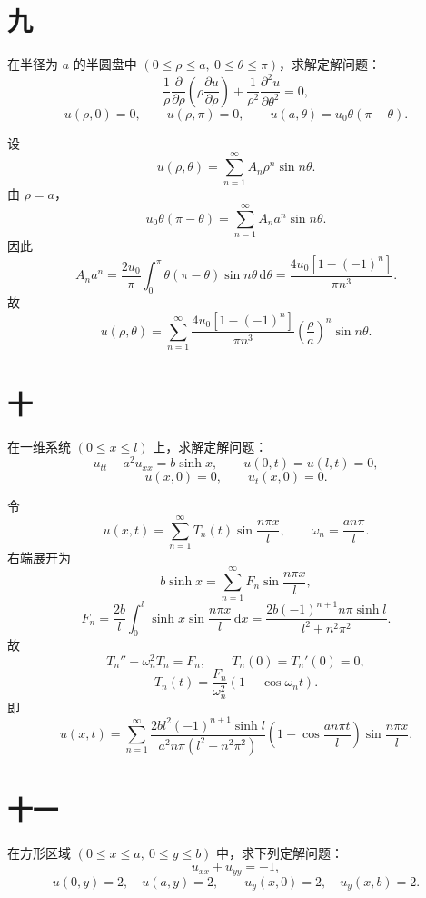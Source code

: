\documentclass[UTF8,zihao=-4]{ctexart}
\begin{document}
\section*{九}

在半径为 $a$ 的半圆盘中 $(0\le\rho\le a,\ 0\le\theta\le\pi)$，求解定解问题：
\[
\dfrac1\rho\dfrac{\partial}{\partial\rho}\left(\rho\dfrac{\partial u}{\partial\rho}\right)
+\dfrac1{\rho^2}\dfrac{\partial^2u}{\partial\theta^2}=0,
\]
\[
u(\rho,0)=0,\qquad u(\rho,\pi)=0,\qquad
u(a,\theta)=u_0\theta(\pi-\theta).
\]

设
\[
u(\rho,\theta)=\sum_{n=1}^{\infty}A_n\rho^n\sin n\theta.
\]
由 $\rho=a$，
\[
u_0\theta(\pi-\theta)=\sum_{n=1}^{\infty}A_na^n\sin n\theta.
\]
因此
\[
A_na^n=\dfrac{2u_0}{\pi}\int_0^\pi \theta(\pi-\theta)\sin n\theta\,\mathrm{d}\theta
=\dfrac{4u_0\left[1-(-1)^n\right]}{\pi n^3}.
\]
故
\[
u(\rho,\theta)=
\sum_{n=1}^{\infty}
\dfrac{4u_0\left[1-(-1)^n\right]}{\pi n^3}
\left(\dfrac{\rho}{a}\right)^n\sin n\theta.
\]

\section*{十}

在一维系统 $(0\le x\le l)$ 上，求解定解问题：
\[
u_{tt}-a^2u_{xx}=b\sinh x,\qquad
u(0,t)=u(l,t)=0,
\]
\[
u(x,0)=0,\qquad u_t(x,0)=0.
\]

令
\[
u(x,t)=\sum_{n=1}^{\infty}T_n(t)\sin\dfrac{n\pi x}{l},\qquad
\omega_n=\dfrac{an\pi}{l}.
\]
右端展开为
\[
b\sinh x=\sum_{n=1}^{\infty}F_n\sin\dfrac{n\pi x}{l},
\]
\[
F_n=\dfrac{2b}{l}\int_0^l\sinh x\sin\dfrac{n\pi x}{l}\,\mathrm{d}x
=\dfrac{2b(-1)^{n+1}n\pi\sinh l}{l^2+n^2\pi^2}.
\]
故
\[
T_n''+\omega_n^2T_n=F_n,\qquad T_n(0)=T_n'(0)=0,
\]
\[
T_n(t)=\dfrac{F_n}{\omega_n^2}(1-\cos\omega_nt).
\]
即
\[
u(x,t)=\sum_{n=1}^{\infty}
\dfrac{2bl^2(-1)^{n+1}\sinh l}{a^2n\pi(l^2+n^2\pi^2)}
\left(1-\cos\dfrac{an\pi t}{l}\right)\sin\dfrac{n\pi x}{l}.
\]

\section*{十一}

在方形区域 $(0\le x\le a,\ 0\le y\le b)$ 中，求下列定解问题：
\[
u_{xx}+u_{yy}=-1,
\]
\[
u(0,y)=2,\quad u(a,y)=2,\qquad
u_y(x,0)=2,\quad u_y(x,b)=2.
\]
\end{document}

